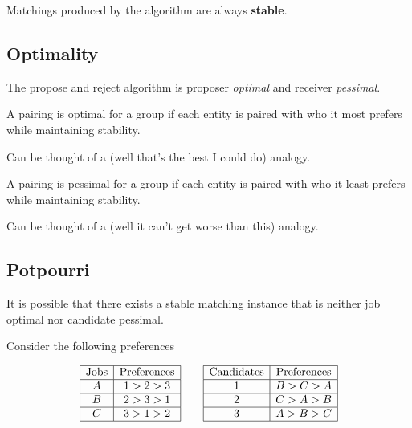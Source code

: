 Matchings produced by the algorithm are always \textbf{stable}. 

\subsection{Optimality}

The propose and reject algorithm is proposer \textit{optimal} and receiver \textit{pessimal}.

\begin{definition}[optimal]
    A pairing is optimal for a group if each entity is paired with who it most prefers  while maintaining stability. 
\end{definition}

Can be thought of a (well that's the best I could do) analogy. 

\begin{definition}[pessimal]
    A pairing is pessimal for a group if each entity is paired with who it least prefers while maintaining stability.
\end{definition}

Can be thought of a (well it can't get worse than this) analogy. 

\subsection{Potpourri}
It is possible that there exists a stable matching instance that is neither job optimal nor candidate pessimal. 

Consider the following preferences

\[\begin{array}{|c|c|}
    \hline
    \text{Jobs} & \text{Preferences} \\
    \hline
    A & 1 > 2 > 3 \\
    \hline 
    B & 2 > 3 > 1\\
    \hline
    C & 3 > 1 > 2\\
    \hline
\end{array}
    \qquad 
    \begin{array}{|c|c|}
        \hline
        \text{Candidates} & \text{Preferences} \\
        \hline
        1 & B > C > A  \\
        \hline 
        2 & C > A > B \\
        \hline
        3 & A > B > C \\
        \hline
    \end{array}\]  

